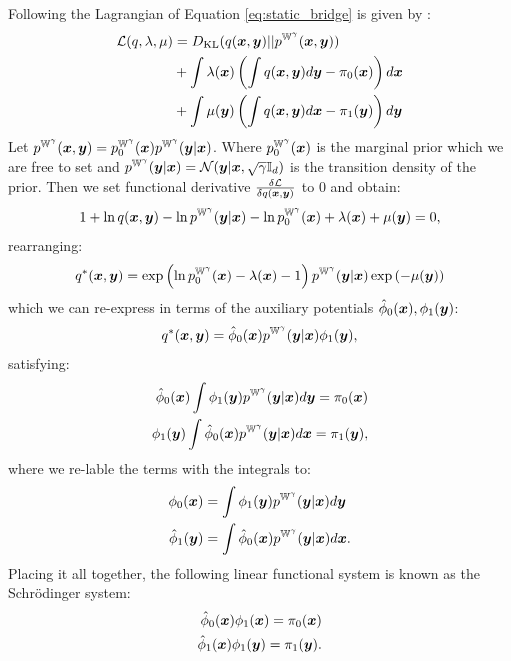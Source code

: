 \documentclass[a4paper,12pt,twoside,openright]{report}
\theoremstyle{definition}
\begin{document}
Following \cite{pavon2018data} the Lagrangian of Equation \ref{eq:static_bridge} is given by :
\begin{align}\label{eq:schro_lagrangian}
    {\mathcal{L}}(q, \lambda,  \mu) &=  D_{\mathrm{KL}} (q({\bm{x}},{\bm{y}})  || p^{\mathbb{W}^{\gamma}}({\bm{x}},{\bm{y}}))  \nonumber\\
    &+ \int \lambda({\bm{x}})\left( \int q({\bm{x}},{\bm{y}})d{\bm{y}} -\pi_0({\bm{x}})\right)d{\bm{x}} \nonumber \\
    &+ \int \mu({\bm{y}}) \left(\int q({\bm{x}},{\bm{y}}) d{\bm{x}} - \pi_1({\bm{y}})\right) d{\bm{y}}
\end{align}
Let $p^{\mathbb{W}^{\gamma}}({\bm{x}},{\bm{y}}) = p^{\mathbb{W}^{\gamma}}_0({\bm{x}})p^{\mathbb{W}^{\gamma}}({\bm{y}}|{\bm{x}})$. Where $p^{\mathbb{W}^{\gamma}}_0({\bm{x}})$ is the marginal prior which we are free to set and $p^{\mathbb{W}^{\gamma}}({\bm{y}}|{\bm{x}})={\mathcal{N}}({\bm{y}} | {\bm{x}}, \sqrt{\gamma}{\mathbb{I}_d})$ is the transition density of the prior. Then we set functional derivative $\frac{\delta {\mathcal{L}}}{\delta q({\bm{x}}, {\bm{y}})}$ to 0 and obtain:
\begin{align*}
    1 + \ln q({\bm{x}}, {\bm{y}})  - \ln p^{\mathbb{W}^{\gamma}}({\bm{y}}|{\bm{x}})
    - \ln p^{\mathbb{W}^{\gamma}}_0({\bm{x}})+ \lambda({\bm{x}})
+ \mu({\bm{y}}) = 0, \nonumber
\end{align*}
rearranging:
\begin{align*}
{q^{*}({\bm{x}}, {\bm{y}}) }  = \exp\left(  \ln p^{\mathbb{W}^{\gamma}}_0({\bm{x}}) -\lambda({\bm{x}}) -1\right)p^{\mathbb{W}^{\gamma}}({\bm{y}}|{\bm{x}})\exp\left(- \mu({\bm{y}})\right) \nonumber
\end{align*}
which we can re-express in terms of the auxiliary potentials ${\hat{\phi}}_0({\bm{x}}), \phi_1({\bm{y}})$:
\begin{align*}
{q^{*}({\bm{x}}, {\bm{y}}) }  = {\hat{\phi}}_0({\bm{x}})p^{\mathbb{W}^{\gamma}}({\bm{y}}|{\bm{x}})\phi_1({\bm{y}}), \nonumber
\end{align*}
satisfying:
\begin{align}
    {\hat{\phi}}_0({\bm{x}}) \int \phi_1({\bm{y}}) p^{\mathbb{W}^{\gamma}}({\bm{y}}|{\bm{x}}) d{\bm{y}} = \pi_0({\bm{x}})  \nonumber\\ 
    \phi_1({\bm{y}}) \int {\hat{\phi}}_0({\bm{x}}) p^{\mathbb{W}^{\gamma}}({\bm{y}}|{\bm{x}}) d{\bm{x}} = \pi_1({\bm{y}}), \nonumber
\end{align}
where we re-lable the terms with the integrals to:
\begin{align} \label{eq:sysint}
    \phi_0({\bm{x}}) &= \int \phi_1({\bm{y}}) p^{\mathbb{W}^{\gamma}}({\bm{y}}|{\bm{x}}) d{\bm{y}} \nonumber\\ 
    {\hat{\phi}}_1({\bm{y}}) &= \int {\hat{\phi}}_0({\bm{x}}) p^{\mathbb{W}^{\gamma}}({\bm{y}}|{\bm{x}}) d{\bm{x}}. \nonumber
\end{align}
Placing it all together, the following linear functional system is known as the Schrödinger system:
\begin{align}
    {\hat{\phi}}_0({\bm{x}}) \phi_1({\bm{x}})  = \pi_0({\bm{x}})  \nonumber \\ 
    {\hat{\phi}}_1({\bm{x}}) \phi_1({\bm{y}})  = \pi_1({\bm{y}}).
\end{align}
\end{document}
